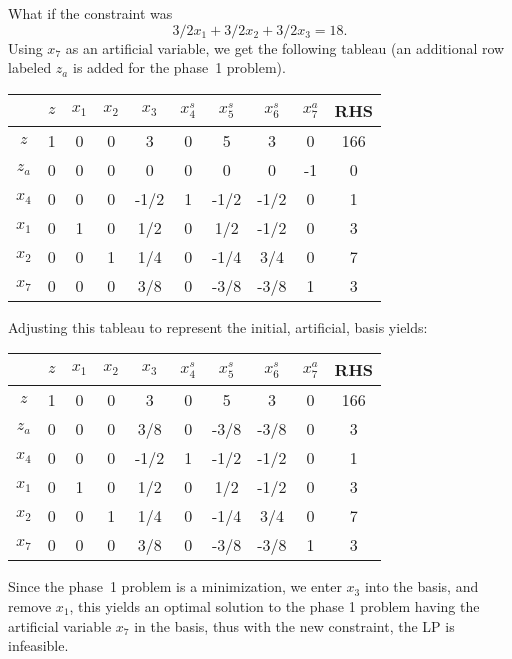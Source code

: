 \medskip What if the constraint was $$3/2 x_1 + 3/2x_2 + 3/2x_3 = 18.$$ Using $x_7$ as an artificial variable, we get the following tableau (an additional row labeled $z_a$ is added for the phase~1 problem).
\begin{center} \begin{tabular} {|c|c|c|c|c|c|c|c|c|c|}
\hline       & $z$ & $x_1$ & $x_2$ & $x_3$ & $x^s_4$ & $x^s_5$ & $x^s_6$ &  $x^a_7$  & RHS \\ \hline
\hline $z$   & 1  & 0     & 0     & 3      & 0    & 5     & 3     & 0       & 166  \\
\hline $z_a$ & 0  & 0     & 0     & 0      & 0    & 0     & 0     & -1      & 0    \\
\hline $x_4$ & 0  & 0     & 0     & -1/2   & 1    & -1/2  & -1/2  & 0       & 1    \\
\hline $x_1$ & 0  & 1     & 0     & 1/2    & 0    & 1/2   & -1/2  & 0       & 3    \\
\hline $x_2$  & 0  & 0     & 1     & 1/4    & 0    & -1/4  & 3/4   & 0       & 7    \\
\hline $x_7$ & 0  & 0     & 0     & 3/8    & 0    & -3/8  & -3/8  & 1       & 3    \\ \hline
\end{tabular} \end{center}
Adjusting this tableau to represent the initial, artificial, basis yields:
\begin{center} \begin{tabular} {|c|c|c|c|c|c|c|c|c|c|}
\hline       & $z$ & $x_1$ & $x_2$ & $x_3$ & $x^s_4$ & $x^s_5$ & $x^s_6$ &  $x^a_7$  & RHS \\ \hline
\hline $z$   & 1  & 0     & 0     & 3      & 0    & 5     & 3     & 0       & 166  \\
\hline $z_a$ & 0  & 0     & 0     & 3/8      & 0    & -3/8     & -3/8     & 0      & 3    \\
\hline $x_4$ & 0  & 0     & 0     & -1/2   & 1    & -1/2  & -1/2  & 0       & 1    \\
\hline $x_1$ & 0  & 1     & 0     & 1/2    & 0    & 1/2   & -1/2  & 0       & 3    \\
\hline $x_2$  & 0  & 0     & 1     & 1/4    & 0    & -1/4  & 3/4   & 0       & 7    \\
\hline $x_7$ & 0  & 0     & 0     & 3/8    & 0    & -3/8  & -3/8  & 1       & 3    \\ \hline
\end{tabular} \end{center}
Since the phase~1 problem is a minimization, we  enter $x_3$ into the basis, and remove $x_1$, this yields an optimal solution to the phase 1 problem having the artificial variable $x_7$ in the basis, thus with the new constraint, the LP is infeasible. 

